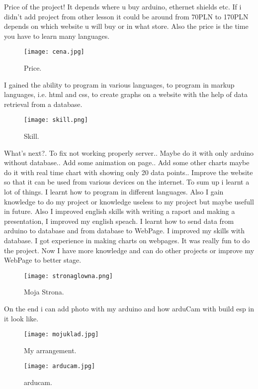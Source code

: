 Price of the project!
It depends where u buy arduino, ethernet shields etc. If i didn't add project from other lesson it could be around from 70PLN to 170PLN depends on which website u will buy or in what store. Also the price is the time you have to learn many languages.
\begin{figure}[!h]
	\centering
	\texttt{[image: cena.jpg]}
	\caption{Price.\label{fig:Cena}}
\end{figure}
\newline
\newline
I gained the ability to program in various languages, to program in markup languages, i.e. html and css, to create graphs on a website with the help of data retrieval from a database.

\begin{figure}[!h]
	\centering
	\texttt{[image: skill.png]}
	\caption{Skill.\label{fig:Skill}}
\end{figure}
What's next?. To fix not working properly server.. Maybe do it with only arduino without database.. Add some animation on page.. Add some other charts maybe do it with real time chart with showing only 20 data points.. Improve the website so that it can be used from various devices on the internet.\newline
\newline
\newline
To sum up i learnt a lot of things. I learnt how to program in different languages. Also I gain knowledge to do my project or knowledge useless to my project but maybe usefull in future. Also I improved english skills with writing a raport and making a presentation, I improved my english speach. I learnt how to send data from arduino to database and from database to WebPage. I improved my skills with database. I got experience in making charts on webpages. It was really fun to do the project. Now I have more knowledge and can do other projects or improve my WebPage to better stage.
\begin{figure}[!b]
	\centering
	\texttt{[image: stronaglowna.png]}
	\caption{Moja Strona.\label{fig:Stronaglowna}}
\end{figure}
\newline
On the end i can add photo with my arduino and how arduCam with build esp in it look like.\newline

\begin{figure}[!b]
	\centering
	\texttt{[image: mojuklad.jpg]}
	\caption{My arrangement.\label{fig:Myarrangement}}
\end{figure}
\begin{figure}[!b]
	\centering
	\texttt{[image: arducam.jpg]}
	\caption{arducam.\label{fig:arducam}}
\end{figure}